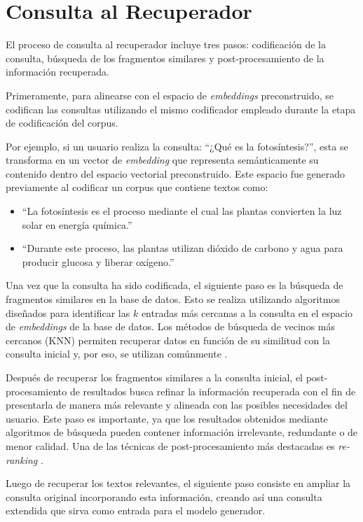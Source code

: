 \section{Consulta al Recuperador}

El proceso de consulta al recuperador incluye tres pasos: codificación de la consulta, búsqueda de los fragmentos similares y post-procesamiento de la información recuperada.

Primeramente, para alinearse con el espacio de \textit{embeddings} preconstruido, se codifican las consultas utilizando el mismo codificador empleado durante la etapa de codificación del corpus.

Por ejemplo, si un usuario realiza la consulta:
``¿Qué es la fotosíntesis?'', esta se transforma en un vector de \textit{embedding} que representa semánticamente su contenido dentro del espacio vectorial preconstruido. Este espacio fue generado previamente al codificar un corpus que contiene textos como:
\begin{itemize} 
    \item ``La fotosíntesis es el proceso mediante el cual las plantas convierten la luz solar en energía química.'' 
    \item ``Durante este proceso, las plantas utilizan dióxido de carbono y agua para producir glucosa y liberar oxígeno.''
\end{itemize}

Una vez que la consulta ha sido codificada, el siguiente paso es la búsqueda de fragmentos similares en la base de datos. Esto se realiza utilizando algoritmos diseñados para identificar las \(k\) entradas más cercanas a la consulta en el espacio de \textit{embeddings} de la base de datos. Los métodos de búsqueda de vecinos más cercanos (KNN) permiten recuperar datos en función de su similitud con la consulta inicial y, por eso, se utilizan comúnmente \cite{johnson2021billion}.

Después de recuperar los fragmentos similares a la consulta inicial, el post-procesamiento de resultados busca refinar la información recuperada con el fin de presentarla de manera más relevante y alineada con las posibles necesidades del usuario. Este paso es importante, ya que los resultados obtenidos mediante algoritmos de búsqueda pueden contener información irrelevante, redundante o de menor calidad. Una de las técnicas de post-procesamiento más destacadas es \textit{re-ranking} \cite{mortaheb2025rerankingcontextmultimodalretrieval}.

Luego de recuperar los textos relevantes, el siguiente paso consiste en ampliar la consulta original incorporando esta información, creando así una consulta extendida que sirva como entrada para el modelo generador.

